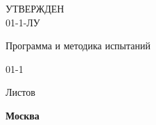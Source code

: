 
\begin{flushleft}
\begin{varwidth}{\linewidth}\centering
	\large
	УТВЕРЖДЕН \\
	{\docId} 01-1-ЛУ
\end{varwidth}
\end{flushleft}

\vskip4cm

{\Large\uppercase{\docTitle}}

\vskip1cm

{\large
	Программа и методика испытаний

	{\docId} 01-1
}

\vskip1cm

Листов \pageref*{LastPage}

\vfill
\textbf{Москва \YEAR}